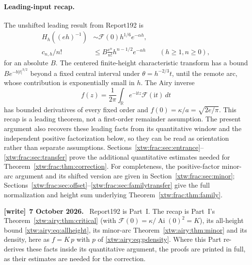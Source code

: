 \documentclass[11pt]{article}
\theoremstyle{remark}\newtheorem{remark}[theorem]{Remark}
\newcommand{\R}{\mathbb R}
\newcommand{\Ai}{\operatorname{Ai}}
\newcommand{\ii}{\mathrm i}
\newcommand{\FF}{\mathcal F}
\newenvironment{writenote}[1][]{\par\smallskip\begingroup\small
 \noindent\textbf{[write]}\if\relax\detokenize{#1}\relax\else~\textbf{#1.}\fi\ }%
 {\par\endgroup\smallskip}
\begin{document}
\paragraph{Leading-input recap.}
The unshifted leading result from Report192 is
\begin{align}
 H_h((eh)^{-1})&\sim\FF(0)h^{1/6}e^{-\alpha h},\label{xtw:frac:eq:leadingheight}\\
 c_{n,h}/n!&\le B\frac{e^n}{n!}h^{n-1/2}e^{-\alpha h}
                      \qquad(h\ge1,n\ge0),\label{xtw:frac:eq:allheight}
\end{align}
for an absolute $B$. The centered finite-height characteristic transform
has a bound $B e^{-b|t|^{3/2}}$ beyond a fixed central interval under
$\theta=h^{-2/3}t$, until the remote arc, whose contribution is exponentially
small in $h$. The Airy inverse
\[
 f(z)=\frac1{2\pi}\int_\R e^{-\ii tz}\FF(\ii t)\,dt
\]
has bounded derivatives of every fixed order and
$f(0)=\kappa/a=\sqrt{2e/\pi}$. This recap is a leading theorem, not a
first-order remainder assumption. The present argument also recovers these
leading facts from its quantitative window and the independent positive
factorization below, so they can be read as orientation rather than
separate assumptions. Sections~\ref{xtw:frac:sec:entrance}--\ref{xtw:frac:sec:transfer}
prove the additional quantitative estimates needed for
Theorem~\ref{xtw:frac:thm:correction}. For completeness, the positive-factor minor-arc
argument and its shifted version are given in Section~\ref{xtw:frac:sec:minor};
Sections~\ref{xtw:frac:sec:offset}--\ref{xtw:frac:sec:familytransfer} give the full normalization
and height sum underlying Theorem~\ref{xtw:frac:thm:family}.
\begin{writenote}[7 October 2026]
Report192 is Part~I. The recap is Part~I's Theorem~\ref{xtw:airy:thm:critical} (with $\FF(0)=\kappa/\Ai(0)^2=K$), its all-height bound \eqref{xtw:airy:eq:allheight}, its minor-arc Theorem~\ref{xtw:airy:thm:minor} and its density, here as $f=K\,p$ with $p$ of \eqref{xtw:airy:eq:pdensity}. Where this Part re-derives these facts inside its quantitative argument, the proofs are printed in full, as their estimates are needed for the correction.
\end{writenote}
\end{document}
